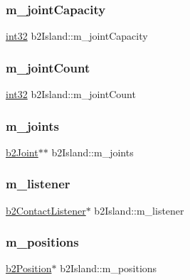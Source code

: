 \subsubsection{\texorpdfstring{m\_jointCapacity}{m\_jointCapacity}}
{\footnotesize\ttfamily \mbox{\hyperlink{b2_settings_8h_a43d43196463bde49cb067f5c20ab8481}{int32}} b2\+Island\+::m\+\_\+joint\+Capacity}

\mbox{\label{classb2_island_a913c91afb35ff717c7dd5b0aa1559e5b}} 
\subsubsection{\texorpdfstring{m\_jointCount}{m\_jointCount}}
{\footnotesize\ttfamily \mbox{\hyperlink{b2_settings_8h_a43d43196463bde49cb067f5c20ab8481}{int32}} b2\+Island\+::m\+\_\+joint\+Count}

\mbox{\label{classb2_island_a6653da11b66de22d8ba5db531c11b373}} 
\subsubsection{\texorpdfstring{m\_joints}{m\_joints}}
{\footnotesize\ttfamily \mbox{\hyperlink{classb2_joint}{b2\+Joint}}$\ast$$\ast$ b2\+Island\+::m\+\_\+joints}

\mbox{\label{classb2_island_aeba73fe42839d0361524d98e330e8e66}} 
\subsubsection{\texorpdfstring{m\_listener}{m\_listener}}
{\footnotesize\ttfamily \mbox{\hyperlink{classb2_contact_listener}{b2\+Contact\+Listener}}$\ast$ b2\+Island\+::m\+\_\+listener}

\mbox{\label{classb2_island_a0f05bd177cf942ddfb494b17ec09b874}} 
\subsubsection{\texorpdfstring{m\_positions}{m\_positions}}
{\footnotesize\ttfamily \mbox{\hyperlink{structb2_position}{b2\+Position}}$\ast$ b2\+Island\+::m\+\_\+positions}

